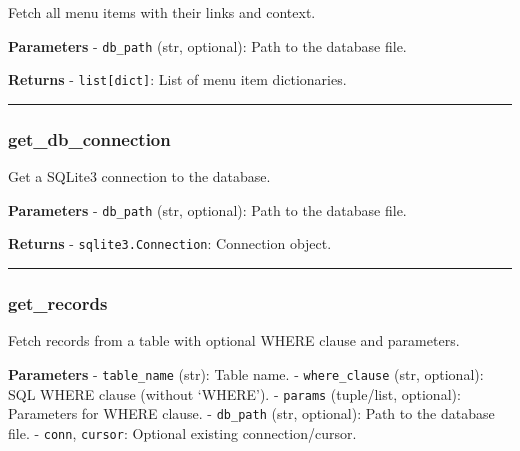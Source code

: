 Fetch all menu items with their links and context.

\textbf{Parameters} - \texttt{db\_path} (str, optional): Path to the
database file.

\textbf{Returns} - \texttt{list{[}dict{]}}: List of menu item
dictionaries.

\begin{center}\rule{0.5\linewidth}{0.5pt}\end{center}

\subsubsection{get\_db\_connection}\label{get_db_connection}

\begin{Shaded}
\begin{Highlighting}[]
\OperatorTok{=}\NormalTok{)}
\end{Highlighting}
\end{Shaded}

Get a SQLite3 connection to the database.

\textbf{Parameters} - \texttt{db\_path} (str, optional): Path to the
database file.

\textbf{Returns} - \texttt{sqlite3.Connection}: Connection object.

\begin{center}\rule{0.5\linewidth}{0.5pt}\end{center}

\subsubsection{get\_records}\label{get_records}

\begin{Shaded}
\begin{Highlighting}[]
\OperatorTok{=}\OperatorTok{=}\OperatorTok{=}\OperatorTok{=}\OperatorTok{=}\NormalTok{)}
\end{Highlighting}
\end{Shaded}

Fetch records from a table with optional WHERE clause and parameters.

\textbf{Parameters} - \texttt{table\_name} (str): Table name. -
\texttt{where\_clause} (str, optional): SQL WHERE clause (without
`WHERE'). - \texttt{params} (tuple/list, optional): Parameters for WHERE
clause. - \texttt{db\_path} (str, optional): Path to the database file.
- \texttt{conn}, \texttt{cursor}: Optional existing connection/cursor.

